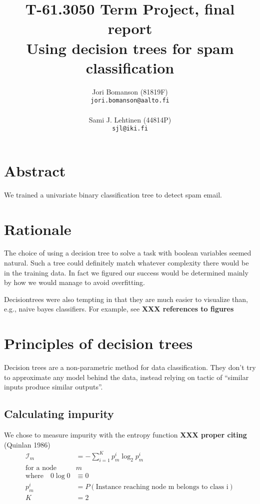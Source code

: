 \documentclass[a4paper,10pt]{article}
\title{T-61.3050 Term Project, final report\\ %
       Using decision trees for spam classification}
\author{Jori Bomanson (81819F) \\
  {\tt jori.bomanson@aalto.fi} \\
  \\
  Sami J. Lehtinen (44814P)\\ 
  {\tt sjl@iki.fi} \\
}
\newcommand{\XXX}[1]{{\bf XXX #1}}
\begin{document}

\maketitle
\thispagestyle{empty}
\pagebreak
{}

\section{Abstract}
We trained a univariate binary classification tree to detect spam email.


\section{Rationale}

The choice of using a decision tree to solve a task with boolean variables
seemed natural. Such a tree could definitely match whatever complexity there
would be in the training data.
In fact we figured our success would be determined mainly by how we would
manage to avoid overfitting.

Decisiontrees were also tempting in that they are much easier to
visualize than, e.g., naive bayes classifiers.  For example, see
\XXX{references to figures}

\section{Principles of decision trees}

Decision trees are a non-parametric method for data classification.
They don't try to approximate any model behind the data, instead relying
on tactic of ``similar inputs produce similar outputs''.

\subsection{Calculating impurity}

We chose to measure impurity with the entropy function \XXX{proper
citing} (Quinlan 1986)
\begin{equation*}
\begin{split}
\mathcal{I}_m &= - \sum_{i=1}^K p_m^i \log_2 p_m^i  \\
\text{for a node} \quad & m  \\
\text{where} \quad 0 \log 0 &\equiv 0  \\
p_m^i &= P(\text{Instance reaching node m belongs to class i})  \\
K &= 2
\end{split}
\end{equation*}
\end{document}
